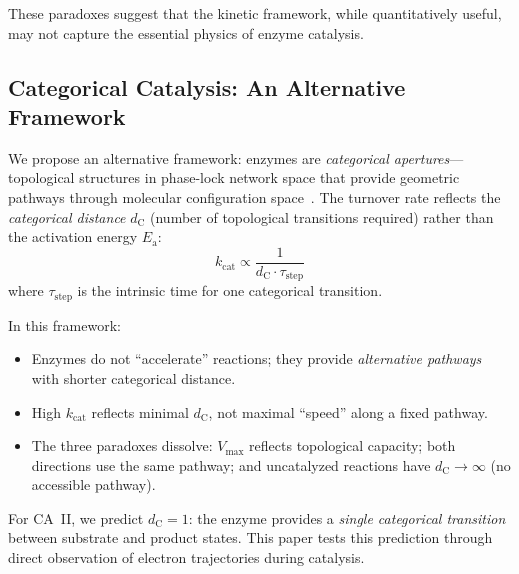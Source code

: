 \documentclass[twocolumn,amsmath,amssymb,aps,prb,superscriptaddress,longbibliography]{revtex4-2}
\newcommand{\dC}{d_{\mathrm{C}}}
\newcommand{\kcat}{k_{\mathrm{cat}}}
\newcommand{\Vmax}{V_{\mathrm{max}}}
\newcommand{\Ea}{E_{\mathrm{a}}}
\begin{document}
These paradoxes suggest that the kinetic framework, while quantitatively useful, may not capture the essential physics of enzyme catalysis.

\subsection{Categorical Catalysis: An Alternative Framework}

We propose an alternative framework: enzymes are \emph{categorical apertures}---topological structures in phase-lock network space that provide geometric pathways through molecular configuration space~\cite{Sachikonye2025}. The turnover rate reflects the \emph{categorical distance} $\dC$ (number of topological transitions required) rather than the activation energy $\Ea$:
\begin{equation}
\kcat \propto \frac{1}{\dC \cdot \tau_{\text{step}}}
\label{eq:kcat-dc}
\end{equation}
where $\tau_{\text{step}}$ is the intrinsic time for one categorical transition.

In this framework:
\begin{itemize}
\item Enzymes do not ``accelerate'' reactions; they provide \emph{alternative pathways} with shorter categorical distance.
\item High $\kcat$ reflects minimal $\dC$, not maximal ``speed'' along a fixed pathway.
\item The three paradoxes dissolve: $\Vmax$ reflects topological capacity; both directions use the same pathway; and uncatalyzed reactions have $\dC \to \infty$ (no accessible pathway).
\end{itemize}

For CA~II, we predict $\dC = 1$: the enzyme provides a \emph{single categorical transition} between substrate and product states. This paper tests this prediction through direct observation of electron trajectories during catalysis.
\end{document}
